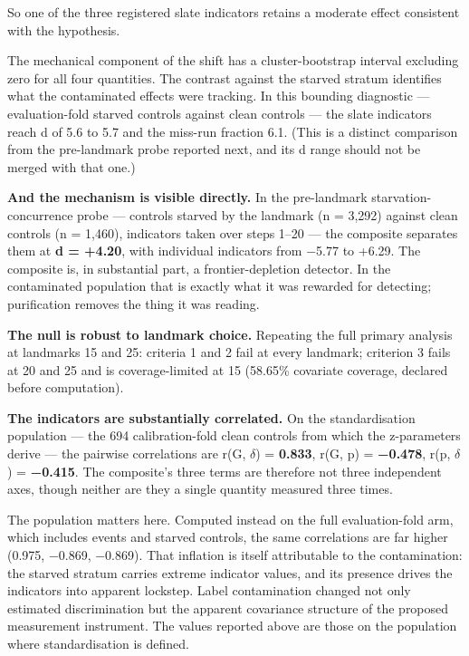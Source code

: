 \documentclass[
  11pt,
]{article}
\begin{document}
So one of the three registered slate indicators retains a moderate
effect consistent with the hypothesis.

The mechanical component of the shift has a cluster-bootstrap interval
excluding zero for all four quantities. The contrast against the starved
stratum identifies what the contaminated effects were tracking. In this
bounding diagnostic --- evaluation-fold starved controls against clean
controls --- the slate indicators reach \textbar d\textbar{} of 5.6 to
5.7 and the miss-run fraction 6.1. (This is a distinct comparison from
the pre-landmark probe reported next, and its d range should not be
merged with that one.)

\textbf{And the mechanism is visible directly.} In the pre-landmark
starvation-concurrence probe --- controls starved by the landmark (n =
3,292) against clean controls (n = 1,460), indicators taken over steps
1--20 --- the composite separates them at \textbf{d = +4.20}, with
individual indicators from −5.77 to +6.29. The composite is, in
substantial part, a frontier-depletion detector. In the contaminated
population that is exactly what it was rewarded for detecting;
purification removes the thing it was reading.

\textbf{The null is robust to landmark choice.} Repeating the full
primary analysis at landmarks 15 and 25: criteria 1 and 2 fail at every
landmark; criterion 3 fails at 20 and 25 and is coverage-limited at 15
(58.65\% covariate coverage, declared before computation).

\textbf{The indicators are substantially correlated.} On the
standardisation population --- the 694 calibration-fold clean controls
from which the z-parameters derive --- the pairwise correlations are
r(G, \(\delta\)) = \textbf{0.833}, r(G, p) = \textbf{−0.478}, r(p,
\(\delta\)) = \textbf{−0.415}. The composite's three terms are therefore
not three independent axes, though neither are they a single quantity
measured three times.

The population matters here. Computed instead on the full
evaluation-fold arm, which includes events and starved controls, the
same correlations are far higher (0.975, −0.869, −0.869). That inflation
is itself attributable to the contamination: the starved stratum carries
extreme indicator values, and its presence drives the indicators into
apparent lockstep. Label contamination changed not only estimated
discrimination but the apparent covariance structure of the proposed
measurement instrument. The values reported above are those on the
population where standardisation is defined.
\end{document}
